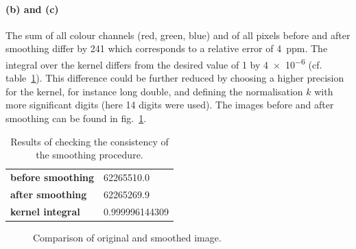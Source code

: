 \documentclass{scrartcl}
\begin{document}
\paragraph*{(b) and (c)} The sum of all colour channels (red, green, blue) and of all pixels before and after smoothing differ by 241 which corresponds to a relative error of 4~ppm. The integral over the kernel differs from the desired value of 1 by \SI{4e-6}{} (cf. table~\ref{tab:check}). This difference could be further reduced by choosing a higher precision for the kernel, for instance long double, and defining the normalisation $k$ with more significant digits (here 14 digits were used). The images before and after smoothing can be found in fig.~\ref{fig:images}.
\begin{table}
	\centering
	\begin{tabular}{l|l}
		\textbf{before smoothing} & 62265510.0 \\
		\textbf{after smoothing}  & 62265269.9 \\
		\textbf{kernel integral}  & 0.999996144309 
	\end{tabular}
	\caption{Results of checking the consistency of the smoothing procedure.}
	\label{tab:check}
\end{table}
\begin{figure}
	 \hfill
	\caption{Comparison of original and smoothed image.}
		\label{fig:images}
\end{figure}
\end{document}
